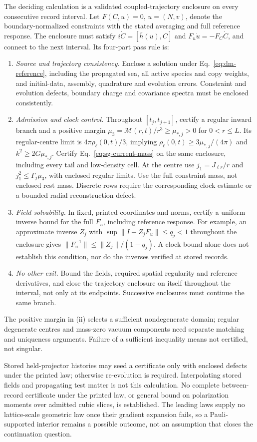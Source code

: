 The deciding calculation is a validated coupled-trajectory
enclosure on every consecutive record interval.
Let \(F(C,u)=0\), \(u=(N,v)\), denote the boundary-normalized
constraints with the stated averaging and full reference response.
The enclosure must satisfy \(i\dot C=[\bar h(u),C]\) and
\(F_u\dot u=-F_C\dot C\), and connect to the next interval.
Its four-part pass rule is:
\begin{enumerate}[label=(\roman*),leftmargin=*]
\item
\emph{Source and trajectory consistency.}
Enclose a solution under Eq.~\eqref{eq:dm-reference}, including
the propagated sea, all active species and copy weights, and
initial-data, assembly, quadrature and evolution errors.
Constraint and evolution defects, boundary charge and covariance
spectra must be enclosed consistently.

\item
\emph{Admission and clock control.}
Throughout \([t_j,t_{j+1}]\), certify a regular inward branch and
a positive margin
\(\mu_3=\mathcal M(r,t)/r^3\ge\mu_{*,j}>0\) for \(0<r\le L\).
Its regular-centre limit is \(4\pi\rho_\ell(0,t)/3\), implying
\(\rho_\ell(0,t)\ge3\mu_{*,j}/(4\pi)\) and
\(k^2\ge2G\mu_{*,j}\).
Certify Eq.~\eqref{eq:sg-current-mass} on the same enclosure,
including every tail and low-density cell. At the centre use
\(j_1=J_{\ell r}/r\) and \(j_1^2\le\Gamma_j\mu_3\), with enclosed
regular limits. Use the full constraint mass, not enclosed rest
mass. Discrete rows require the corresponding clock estimate
or a bounded radial reconstruction defect.

\item
\emph{Field solvability.}
In fixed, printed coordinates and norms, certify a uniform
inverse bound for the full \(F_u\), including reference response.
For example, an approximate inverse \(Z_j\) with
\(\sup\|I-Z_jF_u\|\le q_j<1\) throughout the enclosure gives
\(\|F_u^{-1}\|\le\|Z_j\|/(1-q_j)\).
A clock bound alone does not establish this condition, nor do
the inverses verified at stored records.

\item
\emph{No other exit.}
Bound the fields, required spatial regularity and reference
derivatives, and close the trajectory enclosure on itself
throughout the interval, not only at its endpoints.
Successive enclosures must continue the same branch.
\end{enumerate}
The positive margin in (ii) selects a sufficient nondegenerate
domain; regular degenerate centres and mass-zero vacuum components
need separate matching and uniqueness arguments. Failure of a
sufficient inequality means not certified, not singular.

Stored held-projector histories may seed a certificate only with
enclosed defects under the printed law; otherwise re-evolution is
required. Interpolating stored fields and propagating test matter
is not this calculation. No complete between-record certificate
under the printed law, or general bound on polarization moments
over admitted cubic slices, is established.
The leading laws supply no lattice-scale geometric law once
their gradient expansion fails, so a Pauli-supported interior
remains a possible outcome, not an assumption that closes the
continuation question.
